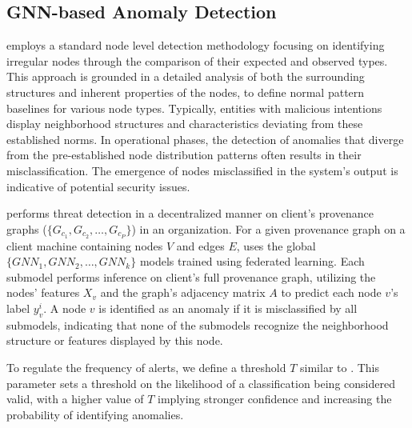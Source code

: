 \subsection{GNN-based Anomaly Detection}
\label{sys:anomaly_detection}

\Sys employs a standard node level detection methodology focusing on identifying irregular nodes through the comparison of their expected and observed types. This approach is grounded in a detailed analysis of both the surrounding structures and inherent properties of the nodes, to define normal pattern baselines for various node types. Typically, entities with malicious intentions display neighborhood structures and characteristics deviating from these established norms. In operational phases, the detection of anomalies that diverge from the pre-established node distribution patterns often results in their misclassification. The emergence of nodes misclassified in the system's output is indicative of potential security issues.

\Sys performs threat detection in a decentralized manner on client's provenance graphs (\( \{G_{c_1}, G_{c_2}, \ldots, G_{c_P}\} \)) in an organization. For a given provenance graph on a client machine containing nodes \(V\) and edges \(E\), \Sys uses the global \(\{GNN_1, GNN_2, \ldots, GNN_k\}\) \gnnshort models trained using federated learning. Each submodel performs inference on client's full provenance graph, utilizing the nodes' features \(X_v\) and the graph's adjacency matrix \(A\) to predict each node \(v\)'s label \(y_v^i\). A node \(v\) is identified as an anomaly if it is misclassified by all submodels, indicating that none of the submodels recognize the neighborhood structure or features displayed by this node. 

To regulate the frequency of alerts, we define a threshold \(T\) similar to \flash. This parameter sets a threshold on the likelihood of a classification being considered valid, with a higher value of \(T\) implying stronger confidence and increasing the probability of identifying anomalies. 